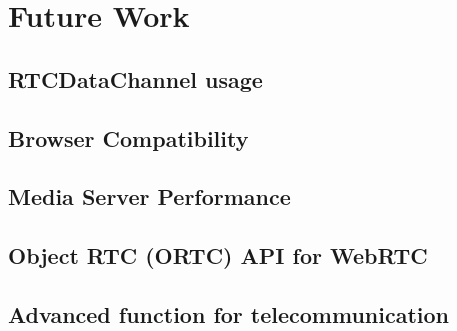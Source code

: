\chapter{Future Work}
\label{chp:future_work}

\section{RTCDataChannel usage}

\section{Browser Compatibility}

\section{Media Server Performance}

\section{Object RTC (ORTC) API for WebRTC}

\section{Advanced function for telecommunication}